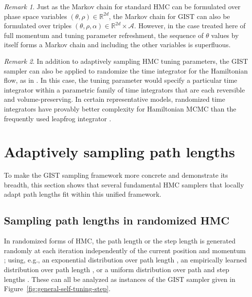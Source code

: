 \documentclass[letterpaper,11pt]{article}
\theoremstyle{plain}%
\theoremstyle{remark}
\newtheorem{remark}{Remark}
\begin{document}
\begin{remark}
Just as the Markov chain for standard HMC can be formulated over phase space variables $(\theta, \rho) \in \mathbb{R}^{2d}$, the Markov chain for GIST can also be formulated over triples $(\theta, \rho, \alpha) \in \mathbb{R}^{2d} \times \mathcal{A}$.  However, in the case treated here of full momentum and tuning parameter refreshment, the sequence of $\theta$ values by itself forms a Markov chain and including the other variables is superfluous.
\end{remark}

\begin{remark}
In addition to adaptively sampling HMC tuning parameters, the GIST sampler can also be applied to randomize the time integrator for the Hamiltonian flow, as in \cite{BouRabeeMarsden2022,BouRabeeKleppe2023}.  In this case, the tuning parameter would specify a particular time integrator within a parametric family of time integrators that are each reversible and volume-preserving.  In certain representative models, randomized time integrators have provably better complexity for Hamiltonian MCMC than the frequently used leapfrog integrator \cite{shen2019randomized,ErgodicityRMMHYB,Cao_2021_IBC,BouRabeeMarsden2022,BouRabeeSchuh2023B,BouRabeeOberdoerster2023}.  
\end{remark}

\section{Adaptively sampling path lengths}\label{sec:pathlength}

To make the GIST sampling framework more concrete and demonstrate its breadth, this section shows that several fundamental HMC samplers that locally adapt path lengths fit within this unified framework.  

\subsection{Sampling path lengths in randomized HMC}\label{ex:exact_rHMC}

In randomized forms of HMC, the path length or the step length is generated randomly at each iteration independently of the current position and momentum \cite{Ma1989}; using, e.g., an exponential distribution over path length \cite{BoSa2017,BoEb2022}, an empirically learned distribution over path length \cite{wu2018faster}, or a uniform distribution over path and step lengths \cite{Ma1989,Ne2011}.  These can all be analyzed as instances of the GIST sampler given in Figure~\ref{fig:general-self-tuning-step}.  
\end{document}
